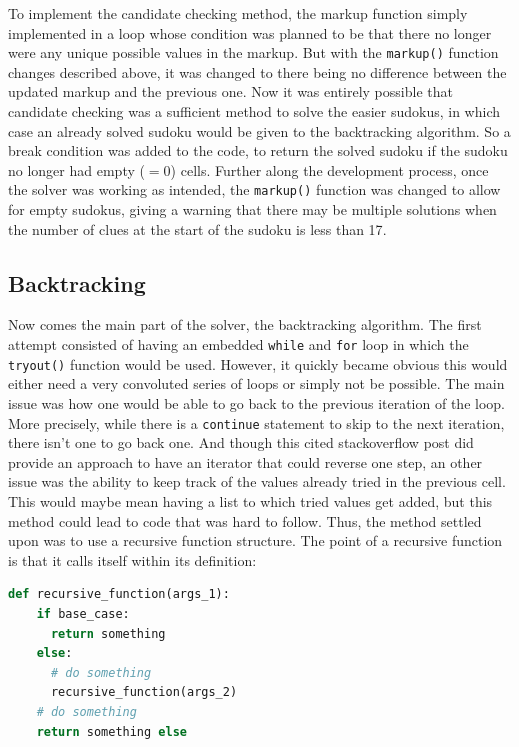 \documentclass[12pt]{report} %
\begin{document}
To implement the candidate checking method, the markup function simply implemented in a loop whose condition was planned to be that there no longer were any unique possible values in the markup. But with the \texttt{markup()} function changes described above, it was changed to there being no difference between the updated markup and the previous one. Now it was entirely possible that candidate checking was a sufficient method to solve the easier sudokus, in which case an already solved sudoku would be given to the backtracking algorithm. So a break condition was added to the code, to return the solved sudoku if the sudoku no longer had empty ($=0$) cells. Further along the development process, once the solver was working as intended, the \texttt{markup()} function was changed to allow for empty sudokus, giving a warning that there may be multiple solutions when the number of clues at the start of the sudoku is less than 17\cite{cornell_sudoku2}.

\subsection{Backtracking}

Now comes the main part of the solver, the backtracking algorithm. The first attempt consisted of having an embedded \texttt{while} and \texttt{for} loop in which the \texttt{tryout()} function would be used. However, it quickly became obvious this would either need a very convoluted series of loops or simply not be possible. The main issue was how one would be able to go back to the previous iteration of the loop. More precisely, while there is a \texttt{continue} statement to skip to the next iteration, there isn't one to go back one\cite{stackoverflow_python_for_loop}. And though this cited stackoverflow post did provide an approach to have an iterator that could reverse one step, an other issue was the ability to keep track of the values already tried in the previous cell\cite{stackoverflow_python_for_loop}. This would maybe mean having a list to which tried values get added, but this method could lead to code that was hard to follow. Thus, the method settled upon was to use a recursive function structure. The point of a recursive function is that it calls itself within its definition:

\begin{lstlisting}[language=Python]
  def recursive_function(args_1):
    if base_case:
      return something
    else:
      # do something
      recursive_function(args_2)
    # do something
    return something else
\end{lstlisting}
\end{document}
